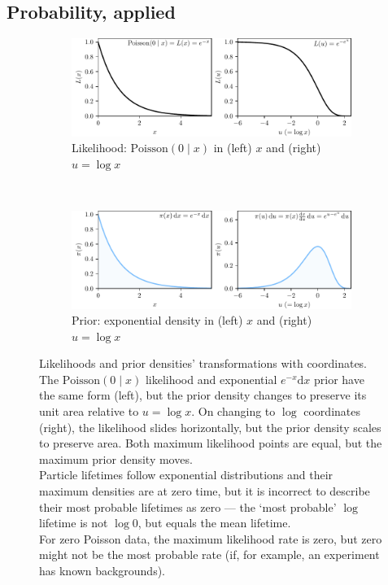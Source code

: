 \subsection{Probability, applied}
\label{sec:searches_probability_applied}
\begin{figure}[tp]
\centering
\begin{subfigure}{\textwidth}
\centering
\includegraphics[width=\textwidth]{figures/searches_abacus_likelihood.pdf}
\caption{%
Likelihood: $\mathrm{Poisson}(0\mid x)$ in
(left) $x$ and
(right) $u = \log x$%
}
\end{subfigure}
\\[.5em]
\begin{subfigure}{\textwidth}
\centering
\includegraphics[width=\textwidth]{figures/searches_abacus_prior.pdf}
\caption{%
Prior: exponential density in
(left) $x$ and
(right) $u = \log x$%
}
\end{subfigure}
\caption[
Likelihoods and prior densities' transformations with coordinates.
]{%
Likelihoods and prior densities' transformations with coordinates.
The $\mathrm{Poisson}(0\mid x)$ likelihood and exponential $e^{-x}\mathrm{d}x$
prior have the same form (left), but the prior density changes to preserve its unit
area relative to $u = \log x$.
On changing to $\log$ coordinates (right), the likelihood slides horizontally,
but the prior density scales to preserve area.
Both maximum likelihood points are equal, but the maximum prior density moves.
\\[.5em]
Particle lifetimes follow exponential distributions and their maximum
densities are at zero time, but it is incorrect to describe their most probable
lifetimes as zero ---
the `most probable' $\log$ lifetime is not $\log 0$, but equals the mean
lifetime.
\\[.5em]
For zero Poisson data, the maximum likelihood rate is zero, but zero might not
be the most probable rate (if, for example, an experiment has known backgrounds).
}
\label{fig:searches_abacus}
\end{figure}
